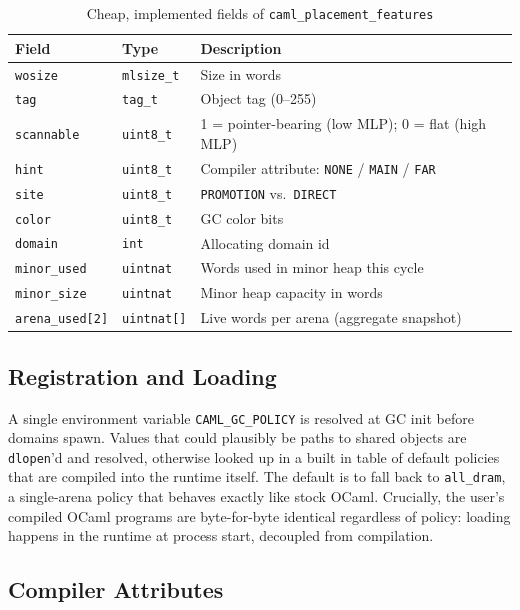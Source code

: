 \documentclass[sigconf]{acmart}
\begin{document}
\begin{table}[h]
\small
\caption{Cheap, implemented fields of \texttt{caml\_placement\_features}}
\label{tab:features}
\begin{tabular}{@{}lll@{}}
\toprule
Field & Type & Description \\
\midrule
\texttt{wosize} & \texttt{mlsize\_t} & Size in words \\
\texttt{tag} & \texttt{tag\_t} & Object tag (0--255) \\
\texttt{scannable} & \texttt{uint8\_t} & 1 = pointer-bearing (low MLP); 0 = flat (high MLP) \\
\texttt{hint} & \texttt{uint8\_t} & Compiler attribute: \texttt{NONE} / \texttt{MAIN} / \texttt{FAR} \\
\texttt{site} & \texttt{uint8\_t} & \texttt{PROMOTION} vs.\ \texttt{DIRECT} \\
\texttt{color} & \texttt{uint8\_t} & GC color bits \\
\texttt{domain} & \texttt{int} & Allocating domain id \\
\texttt{minor\_used} & \texttt{uintnat} & Words used in minor heap this cycle \\
\texttt{minor\_size} & \texttt{uintnat} & Minor heap capacity in words \\
\texttt{arena\_used[2]} & \texttt{uintnat[]} & Live words per arena (aggregate snapshot) \\
\bottomrule
\end{tabular}
\end{table}

\subsection{Registration and Loading}

A single environment variable \texttt{CAML\_GC\_POLICY} is resolved at GC init before domains spawn. Values that could plausibly be paths to shared objects are \texttt{dlopen}'d and resolved, otherwise looked up in a built in table of default policies that are compiled into the runtime itself. The default is to fall back to \texttt{all\_dram}, a
single-arena policy that behaves exactly like stock OCaml. Crucially, the user's compiled OCaml programs are byte-for-byte identical regardless of policy: loading happens in the runtime at process start, decoupled from compilation.

\subsection{Compiler Attributes}
\end{document}
